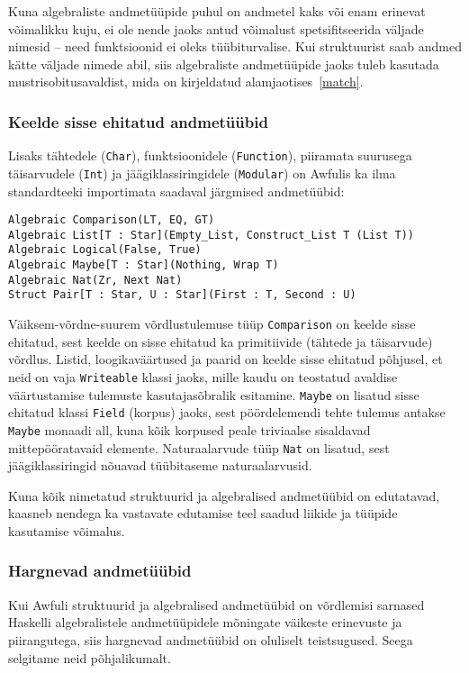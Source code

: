 \documentclass[12pt]{article}
\begin{document}
        Kuna algebraliste andmetüüpide puhul on andmetel kaks või enam erinevat võimalikku kuju, ei ole nende jaoks antud võimalust spetsifitseerida väljade nimesid -- need funktsioonid ei oleks tüübiturvalise. Kui struktuurist saab andmed kätte väljade nimede abil, siis algebraliste andmetüüpide jaoks tuleb kasutada mustrisobitusavaldist, mida on kirjeldatud alamjaotises~\ref{match}.
      \subsubsection{Keelde sisse ehitatud andmetüübid}
        Lisaks tähtedele (\verb!Char!), funktsioonidele (\verb!Function!), piiramata suurusega täisarvudele (\verb!Int!) ja jäägiklassiringidele (\verb!Modular!) on Awfulis ka ilma standardteeki importimata saadaval järgmised andmetüübid:

        \begin{verbatim}Algebraic Comparison(LT, EQ, GT)
Algebraic List[T : Star](Empty_List, Construct_List T (List T))
Algebraic Logical(False, True)
Algebraic Maybe[T : Star](Nothing, Wrap T)
Algebraic Nat(Zr, Next Nat)
Struct Pair[T : Star, U : Star](First : T, Second : U)\end{verbatim}

        Väiksem-võrdne-suurem võrdlustulemuse tüüp \verb!Comparison! on keelde sisse ehitatud, sest keelde on sisse ehitatud ka primitiivide (tähtede ja täisarvude) võrdlus. Listid, loogikaväärtused ja paarid on keelde sisse ehitatud põhjusel, et neid on vaja \verb!Writeable! klassi jaoks, mille kaudu on teostatud avaldise väärtustamise tulemuste kasutajasõbralik esitamine. \verb!Maybe! on lisatud sisse ehitatud klassi \verb!Field! (korpus) jaoks, sest pöördelemendi tehte tulemus antakse \verb!Maybe! monaadi all, kuna kõik korpused peale triviaalse sisaldavad mittepööratavaid elemente. Naturaalarvude tüüp \verb!Nat! on lisatud, sest jäägiklassiringid nõuavad tüübitaseme naturaalarvusid.

        Kuna kõik nimetatud struktuurid ja algebralised andmetüübid on edutatavad, kaasneb nendega ka vastavate edutamise teel saadud liikide ja tüüpide kasutamise võimalus.
      \subsubsection{Hargnevad andmetüübid}\label{hargnevad}
        Kui Awfuli struktuurid ja algebralised andmetüübid on võrdlemisi sarnased Haskelli algebralistele andmetüüpidele mõningate väikeste erinevuste ja piirangutega, siis hargnevad andmetüübid on oluliselt teistsugused. Seega selgitame neid põhjalikumalt.
\end{document}
